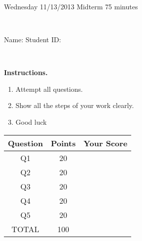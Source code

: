 \documentclass[12pt, oneside]{amsart}
\newcommand{\one}{20}
\newcommand{\two}{20}
\newcommand{\three}{20}
\newcommand{\four}{20}
\newcommand{\five}{20}
\begin{document}
%

\begin{center}
    \hrulefill\\
    {\bf \textsf{\raisebox{-0.10cm}{Fall 2013: MATH 280} \hspace{\fill} 
            \raisebox{-0.10cm}{Numerical Analysis} \hspace{\fill}
            \raisebox{-0.10cm}{David Karapetyan}}}\\
    \hrulefill\\
    {\large \rule{0cm}{1.2cm} \textsf{Wednesday 11/13/2013} \hfill
        \textsf{Midterm} \hfill  \textsf{75 minutes}}\\
    {\large\rule{0cm}{1.2cm}\textsf{Name: \framebox[2.9in]{\rule{0cm}{0.8cm}} 
            \hspace{\fill}
            Student ID: \framebox[2.1in]{\rule{0cm}{0.8cm}}}}\\
\end{center}
\vspace{0.8cm}

\noindent
{\bf \textsf{Instructions.}}

\begin{enumerate}
    \item Attempt all questions.   
    \item Show all the steps of your work clearly.  
    \item Good luck 
\end{enumerate}

\vfill


\begin{center}
    {\large
        \begin{tabular}{|c|c|c|}
            \hline
            \rule[-0.3cm]{0cm}{1cm}
            \textsf{Question} & \textsf{Points} &  \textsf{Your Score} \\
            \hline
            \hline
            \rule[-0.3cm]{0cm}{1cm}
            \textsf{Q1} & \one &\\
            \hline
            \rule[-0.3cm]{0cm}{1cm}
            \textsf{Q2} & \two &\\
            \hline
            \rule[-0.3cm]{0cm}{1cm}
            \textsf{Q3} & \three &\\
            \hline
            \rule[-0.3cm]{0cm}{1cm}
            \textsf{Q4} & \four &\\
            \hline
            \rule[-0.3cm]{0cm}{1cm}
            \textsf{Q5} & \five &\\
            \hline
            \rule[-0.3cm]{0cm}{1cm}

            \textsf{TOTAL} & 100 & \\
            \hline
        \end{tabular}
    } 

\end{center}
\end{document}
